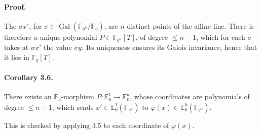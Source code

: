 \documentclass[10pt]{article}
\newcommand{\F}{\mathbb{F}}
\newcommand{\Gal}{\operatorname{Gal}}
\begin{document}
\paragraph{Proof.}
The $\sigma x'$, for $\sigma\in\Gal(\F_{q^n}/\F_q)$, are $n$ distinct points of the affine line.
There is therefore a unique polynomial $P\in\F_{q^n}[T]$, of degree $\le n-1$, which for each $\sigma$ takes at $\sigma x'$ the value $\sigma y$.
Its uniqueness ensures its Galois invariance, hence that it lies in $\F_q[T]$.

\paragraph{Corollary 3.6.}
There exists an $\F_q$-morphism $P:\mathbb E^1_0\to\mathbb E^k_0$, whose coordinates are polynomials of degree $\le n-1$, which sends $x'\in\mathbb E^1_0(\F_{q^n})$ to $\varphi(x)\in\mathbb E^k_0(\F_{q^n})$.

This is checked by applying 3.5 to each coordinate of $\varphi(x)$.
\end{document}
